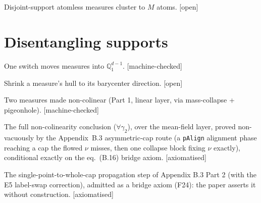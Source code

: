 \begin{proposition}\label{prop:22}
Disjoint-support atomless measures cluster to $M$ atoms. [open]
\end{proposition}

\section{Disentangling supports}

\begin{lemma}\label{lem:32}One switch moves measures into $\mathbb Q_1^{d-1}$. [machine-checked]\end{lemma}
\begin{lemma}\label{lem:33}Shrink a measure's hull to its barycenter direction. [open]\end{lemma}
\begin{lemma}\label{lem:34}Two measures made non-colinear (Part 1, linear layer, via mass-collapse + pigeonhole). [machine-checked]\end{lemma}
\begin{lemma}\label{lem:34b}The full non-colinearity conclusion ($\forall\gamma_2$), over the mean-field layer, proved non-vacuously by the Appendix~B.3 asymmetric-cap route (a \texttt{pAlign} alignment phase reaching a cap the flowed $\nu$ misses, then one collapse block fixing $\nu$ exactly), conditional exactly on the eq.~(B.16) bridge axiom. [axiomatised]
\end{lemma}
\begin{lemma}\label{ax:b16cap}The single-point-to-whole-cap propagation step of Appendix B.3 Part 2 (with the E5 label-swap correction), admitted as a bridge axiom (F24): the paper asserts it without construction. [axiomatised]\end{lemma}

